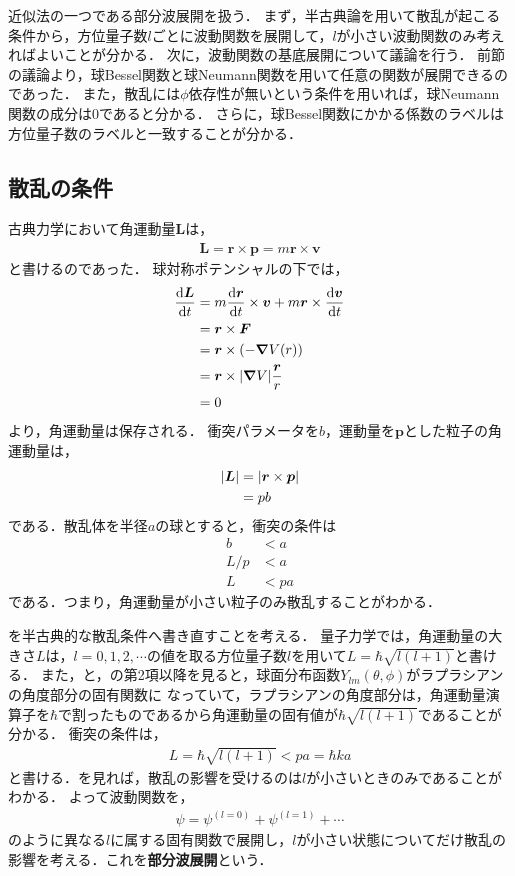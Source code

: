 \documentclass{report}
\begin{document}
  近似法の一つである部分波展開を扱う．
  まず，半古典論を用いて散乱が起こる条件から，方位量子数$l$ごとに波動関数を展開して，$l$が小さい波動関数のみ考えればよいことが分かる．
  次に，波動関数の基底展開について議論を行う．
  前節の議論より，球Bessel関数と球Neumann関数を用いて任意の関数が展開できるのであった．
  また，散乱には$\phi$依存性が無いという条件を用いれば，球Neumann関数の成分は0であると分かる．
  さらに，球Bessel関数にかかる係数のラベルは方位量子数のラベルと一致することが分かる．
  \subsection{散乱の条件}
    古典力学において角運動量$\bm{L}$は，
    \begin{align}
      \bm{L} = \bm{r} \times \bm{p} = m\bm{r} \times \bm{v}
    \end{align}
    と書けるのであった．
    球対称ポテンシャルの下では，
    \begin{align}
      \dv{\bm{L}}{t} &= m\dv{\bm{r}}{t} \times \bm{v} + m\bm{r} \times \dv{\bm{v}}{t} \\
      &= \bm{r} \times \bm{F} \\
      &= \bm{r} \times (-\grad V(r)) \\
      &= \bm{r} \times \abs{\grad V}\frac{\bm{r}}{r} \\
      &= 0
    \end{align}
    より，角運動量は保存される．
    衝突パラメータを$b$，運動量を$\bm{p}$とした粒子の角運動量は，
    \begin{align}
      \abs{\bm{L}} &= \abs{\bm{r} \times \bm{p}} \\
      &= pb
    \end{align}
    である．散乱体を半径$a$の球とすると，衝突の条件は
    \begin{align}
      b &< a \\
      L/p &< a \\
      L &< pa \label{ConditionofSC}
    \end{align}
    である．つまり，角運動量が小さい粒子のみ散乱することがわかる．
    \par
    を半古典的な散乱条件へ書き直すことを考える．
    量子力学では，角運動量の大きさ$L$は，$l = 0, 1, 2, \cdots$の値を取る方位量子数$l$を用いて$L = \hbar \sqrt{l(l + 1)}$と書ける．
    また，と，の第2項以降を見ると，球面分布函数$Y_{lm}(\theta, \phi)$がラプラシアンの角度部分の固有関数に
    なっていて，ラプラシアンの角度部分は，角運動量演算子を$\hbar$で割ったものであるから角運動量の固有値が$\hbar\sqrt{l(l + 1)}$であることが分かる．
    衝突の条件は，
    \begin{align}
      L = \hbar \sqrt{l(l + 1)} < pa = \hbar ka\label{scattering-condition-of-l}
    \end{align}
    と書ける．を見れば，散乱の影響を受けるのは$l$が小さいときのみであることがわかる．
    よって波動関数を，
    \begin{align}
      \psi = \psi^{(l = 0)} + \psi^{(l = 1)} + \cdots
    \end{align}
    のように異なる$l$に属する固有関数で展開し，$l$が小さい状態についてだけ散乱の影響を考える．これを\textbf{部分波展開}という．
\end{document}
